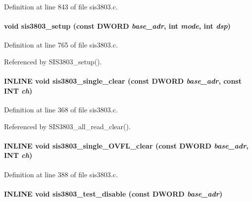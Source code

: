 Definition at line 843 of file sis3803.c.
\paragraph[{sis3803\_\-setup}]{\setlength{\rightskip}{0pt plus 5cm}void sis3803\_\-setup (const {\bf DWORD} {\em base\_\-adr}, \/  int {\em mode}, \/  int {\em dsp})}\hfill\label{sis3803_8c_a6e19934f414b53c9d6da8541b0d871e7}


Definition at line 765 of file sis3803.c.

Referenced by SIS3803\_\-setup().
\paragraph[{sis3803\_\-single\_\-clear}]{\setlength{\rightskip}{0pt plus 5cm}INLINE void sis3803\_\-single\_\-clear (const {\bf DWORD} {\em base\_\-adr}, \/  const {\bf INT} {\em ch})}\hfill\label{sis3803_8c_ac93b24375a60df1b242d5ef90d5ea743}


Definition at line 368 of file sis3803.c.

Referenced by SIS3803\_\-all\_\-read\_\-clear().
\paragraph[{sis3803\_\-single\_\-OVFL\_\-clear}]{\setlength{\rightskip}{0pt plus 5cm}INLINE void sis3803\_\-single\_\-OVFL\_\-clear (const {\bf DWORD} {\em base\_\-adr}, \/  {\bf INT} {\em ch})}\hfill\label{sis3803_8c_a706d7d9fccd97574ff472c59b61b93dd}


Definition at line 388 of file sis3803.c.
\paragraph[{sis3803\_\-test\_\-disable}]{\setlength{\rightskip}{0pt plus 5cm}INLINE void sis3803\_\-test\_\-disable (const {\bf DWORD} {\em base\_\-adr})}\hfill\label{sis3803_8c_a45c1bf893b4537e5aa65c1649d0a0194}


